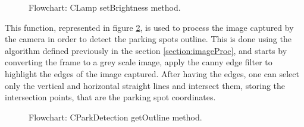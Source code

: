 \begin{figure}[H]
	\centering	
	\caption{Flowchart: CLamp setBrightness method.}
	\label{fig:CLampsetBrightness}
\end{figure}

\clearpage
{}


This function, represented in figure \ref{fig:CParkDetectiongetoutline}, is used to process the image captured by the camera in order to detect the parking spots outline. This is done using the algorithm defined previously in the section \ref{section:imageProc}, and starts by converting the frame to a grey scale image, apply the canny edge filter to highlight the edges of the image captured. After having the edges, one can select only the vertical and horizontal straight lines and intersect them, storing the intersection points, that are the parking spot coordinates.

\begin{figure}[H]
	\centering			
	\caption{Flowchart: CParkDetection getOutline method.}
	\label{fig:CParkDetectiongetoutline}
\end{figure}

\clearpage
{}



